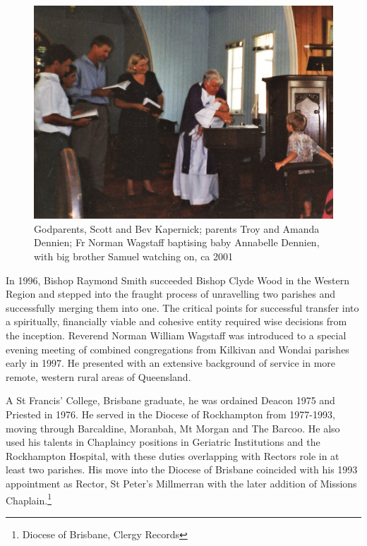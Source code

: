 \begin{figure}[!htb]
\begin{center}
\includegraphics[width=1.\textwidth,center]{../images/baptism2001.jpg}
\caption{Godparents, Scott and Bev Kapernick; parents Troy and Amanda Dennien; Fr Norman Wagstaff baptising baby Annabelle Dennien, with big brother Samuel watching on, ca 2001}
\end{center}
\end{figure}




In 1996, Bishop Raymond Smith succeeded Bishop Clyde Wood in the Western Region and stepped into the fraught process of unravelling two parishes and successfully merging them into one. The critical points for successful transfer into a spiritually, financially viable and cohesive entity required wise decisions from the inception. Reverend Norman William Wagstaff was introduced to a special evening meeting of combined congregations from Kilkivan and Wondai parishes early in 1997. He presented with an extensive background of service in more remote, western rural areas of Queensland.



A St Francis' College, Brisbane graduate, he was ordained Deacon 1975 and Priested in 1976. He served in the Diocese of Rockhampton from 1977-1993, moving through Barcaldine, Moranbah, Mt Morgan and The Barcoo. He also used his talents in Chaplaincy positions in Geriatric Institutions and the Rockhampton Hospital, with these duties overlapping with Rectors role in at least two parishes. His move into the Diocese of Brisbane coincided with his 1993 appointment as Rector, St Peter's Millmerran with the later addition of Missions Chaplain.\footnote{Diocese of Brisbane, Clergy Records}


